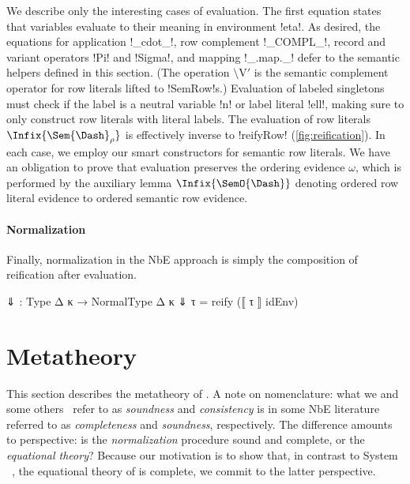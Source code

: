 We describe only the interesting cases of evaluation. The first equation states that variables evaluate to their meaning in environment !eta!. As desired, the equations for application !_cdot_!, row complement !_COMPL_!, record and variant operators !Pi! and !Sigma!, and mapping !_.map._! defer to the semantic helpers defined in this section. (The operation $\setminus\text{V}'$ is the semantic complement operator for row literals lifted to !SemRow!s.) Evaluation of labeled singletons must check if the label is a neutral variable !n! or label literal !ell!, making sure to only construct row literals with literal labels. The evaluation of row literals $\Infix{\Sem{\Dash}_{\rho}}$ is effectively inverse to !reifyRow! (\cref{fig:reification}). In each case, we employ our smart constructors for semantic row literals. We have an obligation to prove that evaluation preserves the ordering evidence $\omega$, which is performed by the auxiliary lemma $\Infix{\SemO{\Dash}}$ denoting ordered row literal evidence to ordered semantic row evidence.

\paragraph{Normalization} Finally, normalization in the NbE approach is simply the composition of reification after evaluation.  

\begin{code}
  ⇓ : Type Δ κ → NormalType Δ κ 
  ⇓ τ = reify (⟦ τ ⟧ idEnv)
\end{code}


\section{Metatheory}
\label{sec:metatheory}

This section describes the metatheory of \Rome. A note on nomenclature: what we and some others~\citep{Lindley05, Friedman75, KellerA10} refer to as \emph{soundness} and \emph{consistency} is in some NbE literature~\citep{Statman82, BergerS91, ChapmanKNW19, Abel13} referred to as \emph{completeness} and \emph{soundness}, respectively. The difference amounts to perspective: is the \emph{normalization} procedure sound and complete, or the \emph{equational theory}? Because our motivation is to show that, in contrast to System \RO~\citep{HubersM23}, the equational theory of \Rome{} is complete, we commit to the latter perspective.

